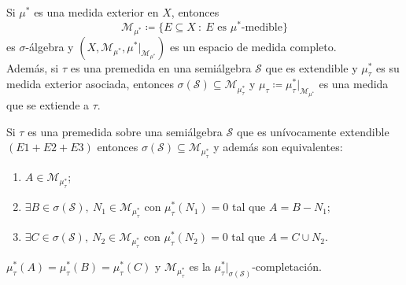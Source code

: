 \begin{corollary}
	Si $\mu^{*}$ es una medida exterior en $X$, entonces
	\[ \mathscr{M}_{\mu^{*}} \coloneq \{E \subseteq X \ : \ E \text{ es } \mu^{*} \text{-medible}\} \]
	es $\sigma$-álgebra y $(X, \mathscr{M}_{\mu^{*}}, \mu^{*}\big|_{\mathscr{M}_{\mu^*}})$ es un espacio de medida completo. \\
	\indent Además, si $\tau$ es una premedida en una semiálgebra $\mathscr{S}$ que es extendible y $\mu^{*}_{\tau}$ es su medida exterior asociada, entonces $\sigma(\mathscr{S}) \subseteq \mathscr{M}_{\mu^{*}_{\tau}}$ y $\mu_{\tau} \coloneq \mu^{*}_{\tau}\big|_{\mathscr{M}_{\mu^{*}}}$ es una medida que se extiende a $\tau$.
\end{corollary}

\begin{theorem}
	Si $\tau$ es una premedida sobre una semiálgebra $\mathscr{S}$ que es unívocamente extendible $(E1 + E2 + E3)$ entonces $\sigma(\mathscr{S}) \subseteq \mathscr{M}_{\mu^{*}_{\tau}}$ y además son equivalentes:
	\begin{enumerate}
		\item $A \in \mathscr{M}_{\mu^{*}_{\tau}}$;

		\item $\exists B \in \sigma(\mathscr{S}),\ N_1 \in \mathscr{M}_{\mu^{*}_{\tau}}$ con $\mu^{*}_{\tau}(N_1) = 0$ tal que $A = B - N_{1}$;

		\item $\exists C \in \sigma(\mathscr{S}),\ N_{2} \in \mathscr{M}_{\mu^{*}_{\tau}}$ con $\mu^{*}_{\tau}(N_{2}) = 0$ tal que $A = C \cup N_{2}$.
	\end{enumerate}
\end{theorem}
\begin{observe}
	$\mu^{*}_{\tau}(A) = \mu^{*}_{\tau}(B) = \mu^{*}_{\tau}(C)$ y $\mathscr{M}_{\mu^{*}_{\tau}}$ es la $\mu^{*}_{\tau}\big|_{\sigma(\mathscr{S})}$-completación.
\end{observe}
